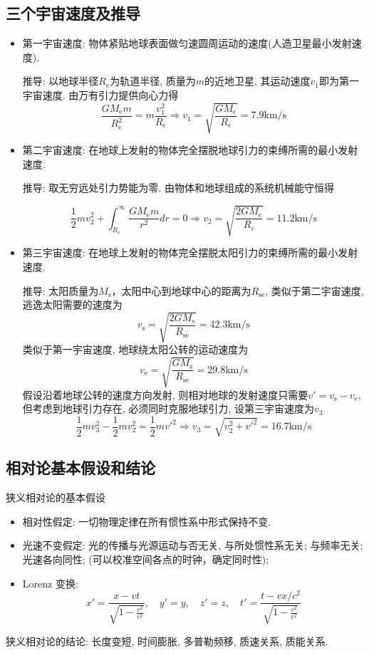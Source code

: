 \documentclass[a4paper,titlepage,twocolumn]{article}
\begin{document}
\subsection{三个宇宙速度及推导}

\begin{itemize}
\item 第一宇宙速度: 物体紧贴地球表面做匀速圆周运动的速度(人造卫星最小发射速度).

推导: 以地球半径$R_{\mathrm{e}}$为轨道半径, 质量为$m$的近地卫星, 其运动速度$v_1$即为第一宇宙速度. 由万有引力提供向心力得
\[
\frac{GM_{\mathrm{e}} m}{R_{\mathrm{e}}^2} = m\frac{v_1^2}{R_{\mathrm{e}}} \Longrightarrow v_1 = \sqrt{\frac{GM_{\mathrm{e}}}{R_{\mathrm{e}}}} = 7.9 \mathrm{km/s}
\]

\item 第二宇宙速度: 在地球上发射的物体完全摆脱地球引力的束缚所需的最小发射速度.

推导: 取无穷远处引力势能为零. 由物体和地球组成的系统机械能守恒得

\[
\frac{1}{2}mv_2^2 + \int_{R_{\mathrm{e}}}^\infty \frac{GM_{\mathrm{e}} m}{r^2} dr = 0 \Longrightarrow v_2 = \sqrt{\frac{2GM_{\mathrm{e}}}{R_{\mathrm{e}}}} = 11.2 \mathrm{km/s}
\]


\item 第三宇宙速度: 在地球上发射的物体完全摆脱太阳引力的束缚所需的最小发射速度. 

推导: 太阳质量为$M_{\mathrm{s}}$，太阳中心到地球中心的距离为$R_{\mathrm{se}}$, 类似于第二宇宙速度, 逃逸太阳需要的速度为
\[
v_{\mathrm{s}} = \sqrt{\frac{2GM_{\mathrm{s}}}{R_{\mathrm{se}}}}= 42.3 \mathrm{km/s}
\]
类似于第一宇宙速度, 地球绕太阳公转的运动速度为
\[
v_{\mathrm{e}} = \sqrt{\frac{GM_{\mathrm{s}}}{R_{\mathrm{se}}}} = 29.8 \mathrm{km/s}
\]
假设沿着地球公转的速度方向发射, 则相对地球的发射速度只需要$v'=v_{\mathrm{s}}-v_{\mathrm{e}}$, 但考虑到地球引力存在, 必须同时克服地球引力, 设第三宇宙速度为$v_3$
\[
\frac{1}{2}mv_3^2- \frac{1}{2}mv_2^2= \frac{1}{2}mv'^2 \Longrightarrow v_3 = \sqrt{v_2^2+v'^2} = 16.7 \mathrm{km/s}
\]

\end{itemize}


\subsection{相对论基本假设和结论}
狭义相对论的基本假设
\begin{itemize}
\item 相对性假定: 一切物理定律在所有惯性系中形式保持不变.
\item 光速不变假定: 光的传播与光源运动与否无关, 与所处惯性系无关; 与频率无关; 光速各向同性; (可以校准空间各点的时钟，确定同时性);
\item Lorenz 变换:
\[
x' = \frac{x-vt}{\sqrt{1-\frac{v^2}{c^2}}},\quad y'=y,\quad z'=z,\quad t' = \frac{t-vx/c^2}{\sqrt{1-\frac{v^2}{c^2}}}
\]
\end{itemize}
狭义相对论的结论: 长度变短, 时间膨胀, 多普勒频移, 质速关系, 质能关系.
\end{document}
